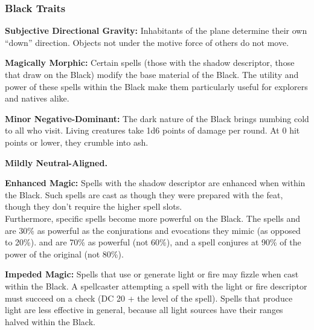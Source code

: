 \subsubsection{Black Traits}
\begin{itemize*}
\item \textbf{Subjective Directional Gravity:} Inhabitants of the plane determine their own ``down'' direction. Objects not under the motive force of others do not move.
\item \textbf{Magically Morphic:} Certain spells (those with the shadow descriptor, those that draw on the Black) modify the base material of the Black. The utility and power of these spells within the Black make them particularly useful for explorers and natives alike.
\item \textbf{Minor Negative-Dominant:} The dark nature of the Black brings numbing cold to all who visit. Living creatures take 1d6 points of damage per round. At 0 hit points or lower, they crumble into ash.
\item \textbf{Mildly Neutral-Aligned.}
\item \textbf{Enhanced Magic:} Spells with the shadow descriptor are enhanced when within the Black. Such spells are cast as though they were prepared with the  feat, though they don't require the higher spell slots.\\

Furthermore, specific spells become more powerful on the Black. The spells  and  are 30\% as powerful as the conjurations and evocations they mimic (as opposed to 20\%).  and  are 70\% as powerful (not 60\%), and a  spell conjures at 90\% of the power of the original (not 80\%).

\item \textbf{Impeded Magic:} Spells that use or generate light or fire may fizzle when cast within the Black. A spellcaster attempting a spell with the light or fire descriptor must succeed on a  check (DC 20 + the level of the spell). Spells that produce light are less effective in general, because all light sources have their ranges halved within the Black.
\end{itemize*}
